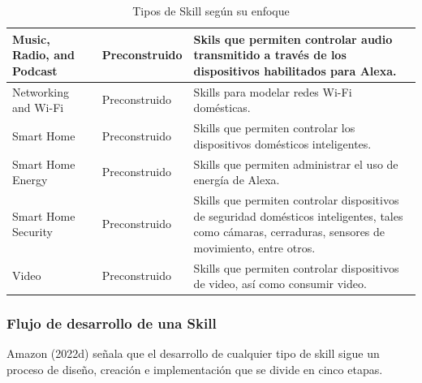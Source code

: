 \begin{table}[t]
\begin{center}
\begin{tabular}{ | p{4cm} | p{4cm} | p{8cm} | }
      Music, Radio, and Podcast & Preconstruido & Skils que permiten controlar audio transmitido a través de los dispositivos habilitados para Alexa. \\ \hline
      Networking and Wi-Fi & Preconstruido & Skills para modelar redes Wi-Fi domésticas. \\ \hline
      Smart Home & Preconstruido & Skills que permiten controlar los dispositivos domésticos inteligentes. \\ \hline
      Smart Home Energy & Preconstruido & Skills que permiten administrar el uso de energía de Alexa. \\ \hline
      Smart Home Security & Preconstruido & Skills que permiten controlar dispositivos de seguridad domésticos inteligentes, tales como cámaras, cerraduras, sensores de movimiento, entre otros. \\ \hline
      Video & Preconstruido & Skills que permiten controlar dispositivos de video, así como consumir video. \\ \hline
    \end{tabular}
    \caption{Tipos de Skill según su enfoque}
    \label{tab:t41}
  \end{center}
\end{table}


\subsubsection{Flujo de desarrollo de una Skill}
\label{FlujoSkillcapIV}

Amazon (2022d) señala que el desarrollo de cualquier tipo de skill sigue un proceso de diseño, creación e implementación que se divide en cinco etapas.

